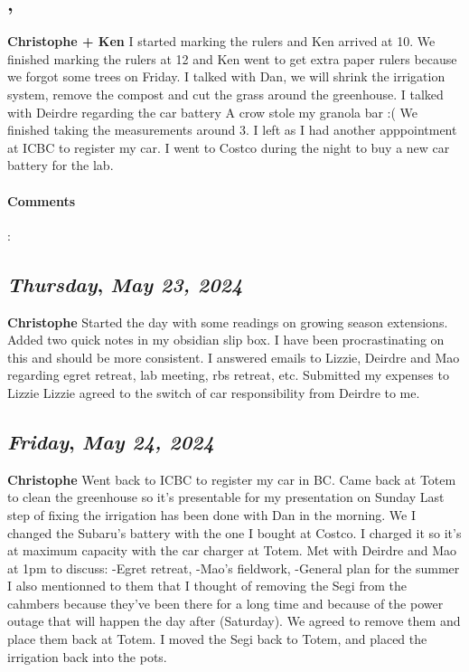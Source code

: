 \subsection*{\weekday, \day}
\textbf{Christophe + Ken}
I started marking the rulers and Ken arrived at 10. 
We finished marking the rulers at 12 and Ken went to get extra paper rulers because we forgot some trees on Friday. 
I talked with Dan, we will shrink the irrigation system, remove the compost and cut the grass around the greenhouse. 
I talked with Deirdre regarding the car battery 
A crow stole my granola bar :(
We finished taking the measurements around 3. I left as I had another apppointment at ICBC to register my car. 
I went to Costco during the night to buy a new car battery for the lab.
\paragraph{Comments}:

\def\day{\textit{May 23, 2024}}
\def\weekday{\textit{Thursday}}
\subsection*{\weekday, \day}
\textbf{Christophe}
Started the day with some readings on growing season extensions. 
Added two quick notes in my obsidian slip box. I have been procrastinating on this and should be more consistent.
I answered emails to Lizzie, Deirdre and Mao regarding egret retreat, lab meeting, rbs retreat, etc.
Submitted my expenses to Lizzie
Lizzie agreed to the switch of car responsibility from Deirdre to me. 

\def\day{\textit{May 24, 2024}}
\def\weekday{\textit{Friday}}
\subsection*{\weekday, \day}
\textbf{Christophe }
Went back to ICBC to register my car in BC.
Came back at Totem to clean the greenhouse so it's presentable for my presentation on Sunday
Last step of fixing the irrigation has been done with Dan in the morning. We 
I changed the Subaru's battery with the one I bought at Costco. I charged it so it's at maximum capacity with the car charger at Totem.
Met with Deirdre and Mao at 1pm to discuss:
-Egret retreat, -Mao's fieldwork, -General plan for the summer
I also mentionned to them that I thought of removing the Segi from the cahmbers because they've been there for a long time and because of the power outage that will happen the day after (Saturday). We agreed to remove them and place them back at Totem.
I moved the Segi back to Totem, and placed the irrigation back into the pots.

